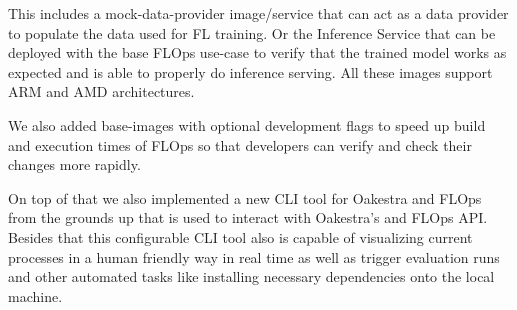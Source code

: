 This includes a mock-data-provider image/service that can act as a data provider to populate the data used for FL training.
Or the Inference Service that can be deployed with the base FLOps use-case to 
verify that the trained model works as expected and is able to properly do inference serving.
All these images support ARM and AMD architectures.

We also added base-images with optional development flags to speed up build and execution times of FLOps
so that developers can verify and check their changes more rapidly.

On top of that we also implemented a new CLI tool for Oakestra and FLOps from the grounds up
that is used to interact with Oakestra's and FLOps API.
Besides that this configurable CLI tool also is capable of visualizing 
current processes in a human friendly way in real time as well as trigger evaluation runs and
other automated tasks like installing necessary dependencies onto the local machine.